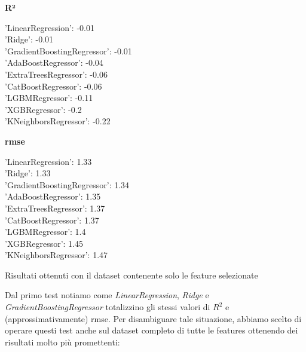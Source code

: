 \documentclass{article}
\begin{document}
\begin{multicols}{2}
\begin{center}
    \textbf{R²}
\end{center}
'LinearRegression': -0.01 \\
'Ridge': -0.01\\
'GradientBoostingRegressor': -0.01\\
'AdaBoostRegressor': -0.04\\
'ExtraTreesRegressor': -0.06\\
'CatBoostRegressor': -0.06\\
'LGBMRegressor': -0.11\\
'XGBRegressor': -0.2\\
'KNeighborsRegressor': -0.22
\columnbreak 
\begin{center}
    \textbf{rmse}
\end{center}
'LinearRegression': 1.33\\
'Ridge': 1.33\\
'GradientBoostingRegressor': 1.34\\
'AdaBoostRegressor': 1.35\\
'ExtraTreesRegressor': 1.37\\
'CatBoostRegressor': 1.37\\
'LGBMRegressor': 1.4\\
'XGBRegressor': 1.45\\
'KNeighborsRegressor': 1.47
\end{multicols}
\begin{center}
    Risultati ottenuti con il dataset contenente solo le feature selezionate
\end{center}
Dal primo test notiamo  come \textit{LinearRegression}, \textit{Ridge} e \textit{GradientBoostingRegressor} totalizzino gli stessi valori di $R^2$ e (approssimativamente) rmse. Per disambiguare tale situazione, abbiamo scelto di operare questi test anche sul dataset completo di tutte le features ottenendo dei risultati molto più promettenti:
\end{document}
